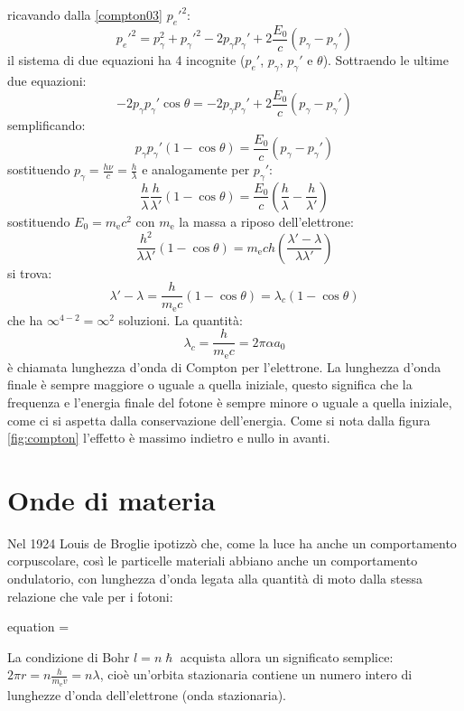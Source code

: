 ricavando dalla \eqref{compton03} $p_e'^2$:
\begin{equation}
	p_e'^2=p_\gamma^2+p_\gamma'^2-2p_\gamma p_\gamma'+2\frac{E_0}{c}(p_\gamma-p_\gamma')
\end{equation}
il sistema di due equazioni ha 4 incognite ($p_e'$, $p_\gamma$, $p_\gamma'$ e $\theta$). Sottraendo le ultime due equazioni:
\begin{equation}
	-2p_\gamma p_\gamma'\cos\theta=-2p_\gamma p_\gamma'+2\frac{E_0}{c}(p_\gamma-p_\gamma')
\end{equation}
semplificando:
\begin{equation}
	p_\gamma p_\gamma'(1-\cos\theta)=\frac{E_0}{c}(p_\gamma-p_\gamma')
\end{equation}
sostituendo $p_\gamma=\frac{h\nu}{c}=\frac{h}{\lambda}$ e analogamente per $p_\gamma'$:
\begin{equation}
	\frac{h}{\lambda}\frac{h}{\lambda'}(1-\cos\theta)=\frac{E_0}{c}\left(\frac{h}{\lambda}-\frac{h}{\lambda'}\right)
\end{equation}
sostituendo $E_0=m_\mathrm{e}c^2$ con $m_\mathrm{e}$ la massa a riposo dell'elettrone:
\begin{equation}
	\frac{h^2}{\lambda\lambda'}(1-\cos\theta)=m_\mathrm{e}ch\left(\frac{\lambda'-\lambda}{\lambda\lambda'}\right)
\end{equation}
si trova:
\begin{equation}
	\lambda'-\lambda=\frac{h}{m_\mathrm{e}c}\left(1-\cos\theta\right)=\lambda_c\left(1-\cos\theta\right)
\end{equation}
che ha $\infty^{4-2}=\infty^2$ soluzioni. La quantità:
\begin{equation}
	\lambda_c=\frac{h}{m_\mathrm{e}c}=2\pi\alpha a_0
\end{equation}
è chiamata lunghezza d'onda di Compton per l'elettrone. La lunghezza d'onda finale è sempre maggiore o uguale a quella iniziale, questo significa che la frequenza e l'energia finale del fotone è sempre minore o uguale a quella iniziale, come ci si aspetta dalla conservazione dell'energia. Come si nota dalla figura \ref{fig:compton} l'effetto è massimo indietro e nullo in avanti.
\section{Onde di materia}
Nel 1924 Louis de Broglie ipotizzò che, come la luce ha anche un comportamento corpuscolare, così le particelle materiali abbiano anche un comportamento ondulatorio, con lunghezza d'onda legata alla quantità di moto dalla stessa relazione che vale per i fotoni:
\begin{eqimp}{equation}
  \lambda=
\end{eqimp}
La condizione di Bohr $l=n\hslash$ acquista allora un significato semplice: $2\pi r=n\frac{h}{m_\mathrm{e}v}=n\lambda$, cioè un'orbita stazionaria contiene un numero intero di lunghezze d'onda dell'elettrone (onda stazionaria).


